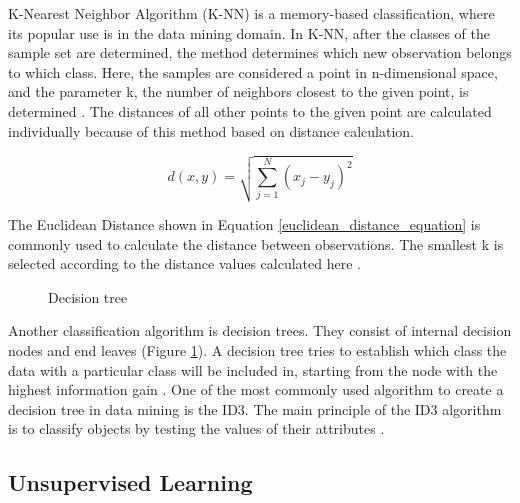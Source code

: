 K-Nearest Neighbor Algorithm (K-NN) is a memory-based classification, where its popular use is in the data mining domain. In K-NN, after the classes of the sample set are determined, the method determines which new observation belongs to which class. Here, the samples are considered a point in n-dimensional space, and the parameter k, the number of neighbors closest to the given point, is determined \cite{cover1967nearest}. The distances of all other points to the given point are calculated individually because of this method based on distance calculation. 

\begin{equation} \label{euclidean_distance_equation}
d(x,y) = \sqrt{\sum_{j=1}^{N}(x_j - y_j)^2}
\end{equation}

The Euclidean Distance shown in Equation \ref{euclidean_distance_equation} is commonly used to calculate the distance between observations. The smallest k is selected according to the distance values calculated here \cite{hall2008choice}.

\begin{figure}[htbp]
\centering
{}
\caption{Decision tree}
\label{fig:DecisionTreeExample}
\end{figure}

Another classification algorithm is decision trees. They consist of internal decision nodes and end leaves (Figure \ref{fig:DecisionTreeExample}). A decision tree tries to establish which class the data with a particular class will be included in, starting from the node with the highest information gain \cite{hssina2014comparative}. One of the most commonly used algorithm to create a decision tree in data mining is the ID3. The main principle of the ID3 algorithm is to classify objects by testing the values of their attributes \cite{jin2009improved}.

\subsection{Unsupervised Learning}

